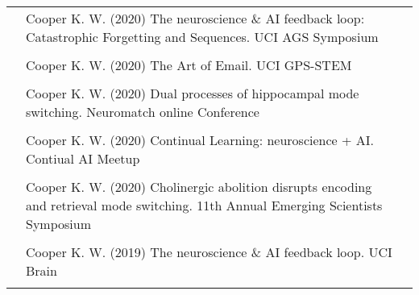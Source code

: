 \documentclass[11pt]{cooperCV_v1/cooperCV} %
\begin{document}
\begin{minipage}{\textwidth}







  \begin{tabular}{ p{} %
                   p{} 
                   p{}} %
  
  \small\textcolor{gray}{{\emph{  }}} & {Cooper K. W. (2020) The neuroscience \& AI feedback loop: Catastrophic Forgetting and Sequences. UCI AGS Symposium} & {\hfill \small{ }} \\ \\
  
  \small\textcolor{gray}{{\emph{  }}} & {Cooper K. W. (2020) The Art of Email. UCI GPS-STEM} & {\hfill \small{ }} \\ \\
  
  \small\textcolor{gray}{{\emph{  }}} & {Cooper K. W. (2020) Dual processes of hippocampal mode switching. Neuromatch online Conference} & {\hfill \small{ }} \\ \\
  
  \small\textcolor{gray}{{\emph{  }}} & {Cooper K. W. (2020) Continual Learning: neuroscience + AI. Contiual AI Meetup} & {\hfill \small{ }} \\ \\
  
  \small\textcolor{gray}{{\emph{  }}} & {Cooper K. W. (2020) Cholinergic abolition disrupts encoding and retrieval mode switching. 11th Annual Emerging Scientists Symposium} & {\hfill \small{ }} \\ \\
  
  \small\textcolor{gray}{{\emph{  }}} & {Cooper K. W. (2019) The neuroscience \& AI feedback loop. UCI Brain} & {\hfill \small{ }} \\ \\
  

\end{tabular}
\end{minipage}
\end{document}
